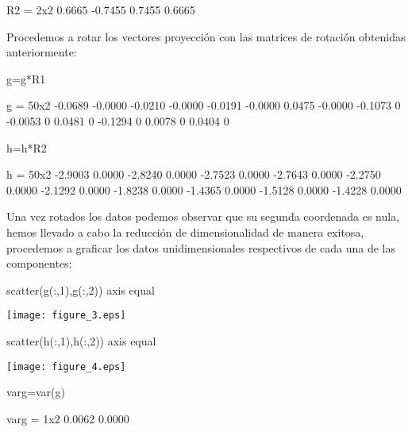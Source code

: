\documentclass{article}
\begin{document}
\begin{matlaboutput}
R2 = 2x2    
    0.6665   -0.7455
    0.7455    0.6665
\end{matlaboutput}
Procedemos a rotar los vectores proyección con las matrices de rotación obtenidas anteriormente:
\begin{matlabcode}
g=g*R1
\end{matlabcode}
\begin{matlaboutput}
g = 50x2    
   -0.0689   -0.0000
   -0.0210   -0.0000
   -0.0191   -0.0000
    0.0475   -0.0000
   -0.1073         0
   -0.0053         0
    0.0481         0
   -0.1294         0
    0.0078         0
    0.0404         0

\end{matlaboutput}
\begin{matlabcode}
h=h*R2
\end{matlabcode}
\begin{matlaboutput}
h = 50x2    
   -2.9003    0.0000
   -2.8240    0.0000
   -2.7523    0.0000
   -2.7643    0.0000
   -2.2750    0.0000
   -2.1292    0.0000
   -1.8238    0.0000
   -1.4365    0.0000
   -1.5128    0.0000
   -1.4228    0.0000
\end{matlaboutput}
Una vez rotados los datos podemos observar que su segunda coordenada es nula, hemos llevado a cabo la reducción de dimensionalidad de manera exitosa, procedemos a graficar los datos unidimensionales respectivos de cada una de las componentes:
\begin{matlabcode}
scatter(g(:,1),g(:,2))
axis equal
\end{matlabcode}
\begin{center}
\texttt{[image: figure\_3.eps]}
\end{center}
\begin{matlabcode}
scatter(h(:,1),h(:,2))
axis equal
\end{matlabcode}
\begin{center}
\texttt{[image: figure\_4.eps]}
\end{center}
\begin{matlabcode}
varg=var(g)
\end{matlabcode}
\begin{matlaboutput}
varg = 1x2    
    0.0062    0.0000
\end{matlaboutput}
\end{document}
